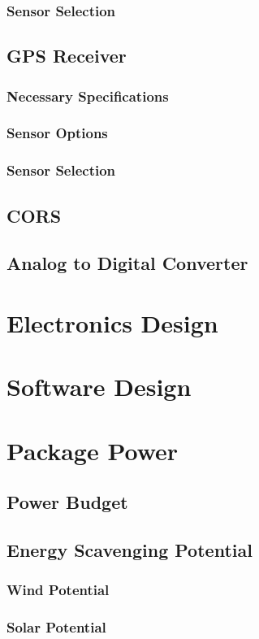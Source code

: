 \documentclass[12pt]{report}
\begin{document}
			\subsubsection{Sensor Selection}
		\subsection{GPS Receiver}			
			\subsubsection{Necessary Specifications}
			\subsubsection{Sensor Options}
			\subsubsection{Sensor Selection}
			\newpage
		\subsection{CORS}
		\subsection{Analog to Digital Converter}
			
	\section{Electronics Design}
			
	\section{Software Design}
	\section{Package Power}
		\subsection{Power Budget}
		\subsection{Energy Scavenging Potential}
			\subsubsection{Wind Potential}
			\subsubsection{Solar Potential}
\end{document}
